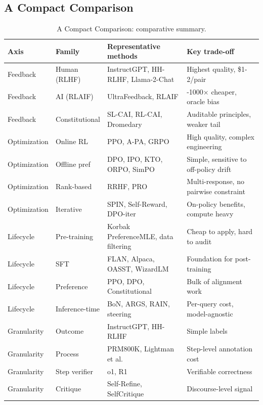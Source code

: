 \documentclass{article}
\begin{document}
\subsection{A Compact Comparison}\label{a-compact-comparison}

\begin{table}[t]
\centering
\caption{A Compact Comparison: comparative summary.}
\label{tab:a-compact-comparison}
\begin{tabular}{>{\raggedright\arraybackslash}p{0.1200\linewidth}
  >{\raggedright\arraybackslash}p{0.1400\linewidth}
  >{\raggedright\arraybackslash}p{0.3600\linewidth}
  >{\raggedright\arraybackslash}p{0.3800\linewidth}}
\toprule
Axis & Family & Representative methods & Key trade-off \\
\midrule
Feedback & Human (RLHF) & InstructGPT, HH-RLHF, Llama-2-Chat & Highest quality, \$1-2/pair \\
Feedback & AI (RLAIF) & UltraFeedback, RLAIF \citep{lee2023rlaifvs} & 100-1000× cheaper, oracle bias \\
Feedback & Constitutional & SL-CAI, RL-CAI, Dromedary & Auditable principles, weaker tail \\
Optimization & Online RL & PPO, A-PA, GRPO & High quality, complex engineering \\
Optimization & Offline pref & DPO, IPO, KTO, ORPO, SimPO & Simple, sensitive to off-policy drift \\
Optimization & Rank-based & RRHF, PRO & Multi-response, no pairwise constraint \\
Optimization & Iterative & SPIN, Self-Reward, DPO-iter & On-policy benefits, compute heavy \\
Lifecycle & Pre-training & Korbak PreferenceMLE, data filtering & Cheap to apply, hard to audit \\
Lifecycle & SFT & FLAN, Alpaca, OASST, WizardLM & Foundation for post-training \\
Lifecycle & Preference & PPO, DPO, Constitutional & Bulk of alignment work \\
Lifecycle & Inference-time & BoN, ARGS, RAIN, steering & Per-query cost, model-agnostic \\
Granularity & Outcome & InstructGPT, HH-RLHF & Simple labels \\
Granularity & Process & PRM800K, Lightman et al. & Step-level annotation cost \\
Granularity & Step verifier & o1, R1 & Verifiable correctness \\
Granularity & Critique & Self-Refine, SelfCritique & Discourse-level signal \\
\end{tabular}
\end{table}
\end{document}
